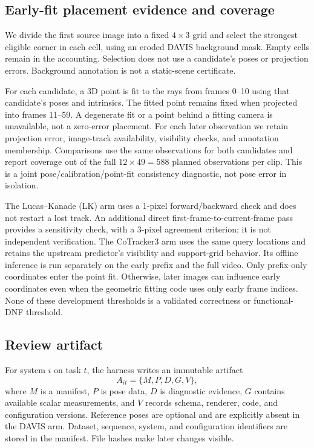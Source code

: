 \documentclass[10pt,twocolumn]{article}
\begin{document}
\subsection{Early-fit placement evidence and coverage}
We divide the first source image into a fixed $4\times3$ grid and select the strongest eligible corner in each cell, using an eroded DAVIS background mask. Empty cells remain in the accounting. Selection does not use a candidate's poses or projection errors. Background annotation is not a static-scene certificate.

For each candidate, a 3D point is fit to the rays from frames 0--10 using that candidate's poses and intrinsics. The fitted point remains fixed when projected into frames 11--59. A degenerate fit or a point behind a fitting camera is unavailable, not a zero-error placement. For each later observation we retain projection error, image-track availability, visibility checks, and annotation membership. Comparisons use the same observations for both candidates and report coverage out of the full $12\times49=588$ planned observations per clip. This is a joint pose/calibration/point-fit consistency diagnostic, not pose error in isolation.

The Lucas--Kanade (LK) arm uses a 1-pixel forward/backward check and does not restart a lost track. An additional direct first-frame-to-current-frame pass provides a sensitivity check, with a 3-pixel agreement criterion; it is not independent verification. The CoTracker3 arm \cite{karaev2024cotracker3} uses the same query locations and retains the upstream predictor's visibility and support-grid behavior. Its offline inference is run separately on the early prefix and the full video. Only prefix-only coordinates enter the point fit. Otherwise, later images can influence early coordinates even when the geometric fitting code uses only early frame indices. None of these development thresholds is a validated correctness or functional-DNF threshold.

\subsection{Review artifact}
For system $i$ on task $t$, the harness writes an immutable artifact
\[
A_{it}=\{M,P,D,G,V\},
\]
where $M$ is a manifest, $P$ is pose data, $D$ is diagnostic evidence, $G$ contains available scalar measurements, and $V$ records schema, renderer, code, and configuration versions. Reference poses are optional and are explicitly absent in the DAVIS arm. Dataset, sequence, system, and configuration identifiers are stored in the manifest. File hashes make later changes visible.
\end{document}

